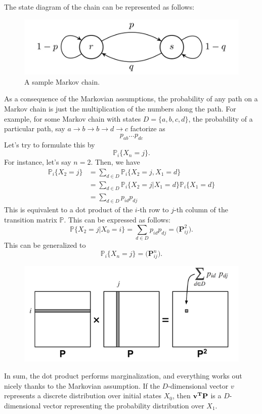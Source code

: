 The state diagram of the chain can be represented as follows:
\begin{figure}[h]
	\centering
	\includegraphics[scale=0.6]{./images/mcmc/transition_diagram.png}
	\caption{A sample Markov chain.}
	\label{fig:markov_chain_1}
\end{figure}
As a consequence of the Markovian assumptions, the probability of any path on a Markov chain is just the multiplication of the numbers along the path. For example, for some Markov chain with states $D=\{a, b, c, d\}$, the probability of a particular path, say $a\to b\to b\to d\to c$ factorize as 
$$p_{ab}\dots p_{dc}$$
Let's try to formulate this by
$$\mathbb{P}_i\{X_n=j\}.$$
For instance, let's say $n=2$. Then, we have
\begin{align*}
	\mathbb{P}_i\{X_2=j\} &= \sum_{d\in D}\mathbb{P}_i\{X_2=j, X_1=d\}\\
	&= \sum_{d\in D}\mathbb{P}_i\{X_2=j | X_1=d\}\mathbb{P}_i\{X_1=d\}\\
	&= \sum_{d\in D}p_{id}p_{dj}
\end{align*}
This is equivalent to a dot product of the $i$-th row to $j$-th column of the transition matrix $\mathbb{P}$. This can be expressed as follows:
$$\mathbb{P}\{X_2=j | X_0=i\} = \sum_{d\in D}p_{id}p_{dj} = \big(\mathbf{P}^2_{ij}\big).$$
This can be generalized to
$$\mathbb{P}_i\{X_n=j\} = \big(\mathbf{P}^n_{ij}\big).$$

\begin{figure}[h]
	\centering
	\includegraphics[scale=0.7]{./images/mcmc/transition_dot_product.png}
\end{figure}
In sum, the dot product performs marginalization, and everything works out nicely thanks to the Markovian assumption. If the $D$-dimensional vector $v$ represents a discrete distribution over initial states $X_0$, then $\bf v^T \bf P$ is a $D$-dimensional vector representing the probability distribution over $X_1$. 

